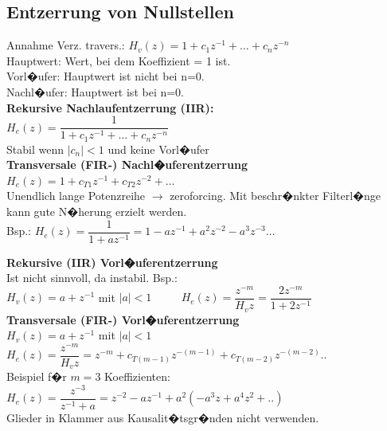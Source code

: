 	\subsection{Entzerrung von Nullstellen}
    \begin{minipage}{9cm}
		Annahme Verz. travers.: $H_v(z)=1+c_1z^{-1}+\ldots+c_nz^{-n}$\\
		Hauptwert: Wert, bei dem Koeffizient = 1 ist.\\
		Vorl�ufer: Hauptwert ist nicht bei n=0.\\
		Nachl�ufer: Hauptwert ist bei n=0.\\

		\textbf{Rekursive Nachlaufentzerrung (IIR):}\\
		$H_e(z)=\dfrac{1}{1+c_1z^{-1}+\ldots+c_nz^{-n}}$\\
		Stabil wenn $|c_n|<1$ und keine Vorl�ufer\\

		\textbf{Transversale (FIR-) Nachl�uferentzerrung}\\
		$H_e(z)=1+c_{T1}z^{-1}+c_{T2}z^{-2}+\ldots$\\
		Unendlich lange Potenzreihe $\rightarrow$ zeroforcing. Mit beschr�nkter
		Filterl�nge kann gute N�herung erzielt werden.\\
		Bsp.: $H_e(z)=\dfrac{1}{1+az^{-1}}=1-az^{-1}+a^2 z^{-2}-a^3 z^{-3}\ldots$\\

    \end{minipage}
		\hfill
    \begin{minipage}{9cm}    	
		\textbf{Rekursive (IIR) Vorl�uferentzerrung}\\
		Ist nicht sinnvoll, da instabil. Bsp.:\\
		$H_v(z)=a+z^{-1}$ mit $|a|<1$ $\qquad$
		$H_e(z)=\dfrac{z^{-m}}{H_v{z}}=\dfrac{2z^{-m}}{1+2z^{-1}}$\\

		\textbf{Transversale (FIR-) Vorl�uferentzerrung}\\
		$H_v(z)=a+z^{-1}$ mit $|a|<1$\\
		$H_e(z)=\dfrac{z^{-m}}{H_v{z}}=z^{-m}+c_{T(m-1)}z^{-(m-1)}+c_{T(m-2)}z^{-(m-2)}..$\\
		Beispiel f�r $m=3$ Koeffizienten:\\
		$H_e(z)=\dfrac{z^{-3}}{z^{-1}+a} = z^{-2}-az^{-1}+a^2 (-a^3z + a^4z^2+ ..)$\\
		Glieder in Klammer aus Kausalit�tsgr�nden nicht verwenden.\\
    \end{minipage}


